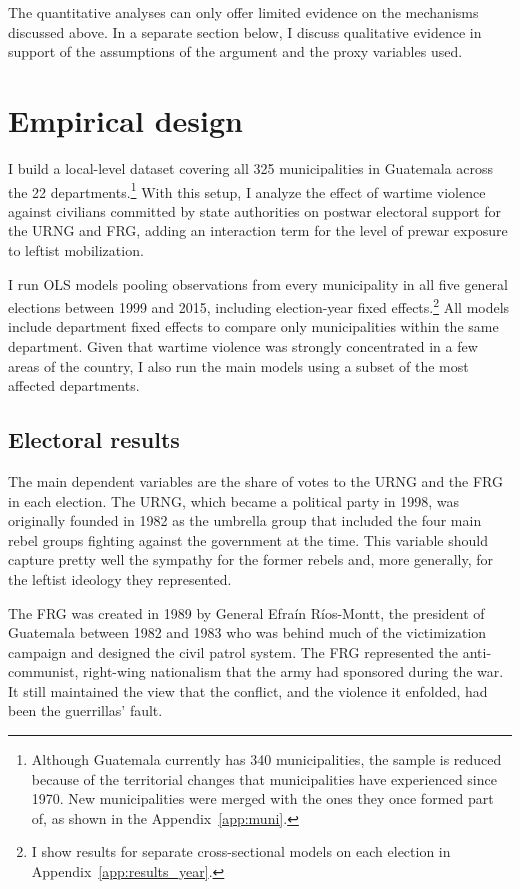 \documentclass[12pt, notitlepage]{article}
\begin{document}
The quantitative analyses can only offer limited evidence on the mechanisms discussed above.
In a separate section below, I discuss qualitative evidence in support of the assumptions of the argument and the proxy variables used.

\section*{Empirical design}

I build a local-level dataset covering all 325 municipalities in Guatemala across the 22 departments.\footnote{Although Guatemala currently has 340 municipalities, the sample is reduced because of the territorial changes that municipalities have experienced since 1970. New municipalities were merged with the ones they once formed part of, as shown in the Appendix~\ref{app:muni}.}
With this setup, I analyze the effect of wartime violence against civilians committed by state authorities on postwar electoral support for the URNG and FRG, adding an interaction term for the level of prewar exposure to leftist mobilization.

I run OLS models pooling observations from every municipality in all five general elections between 1999 and 2015, including election-year fixed effects.\footnote{I show results for separate cross-sectional models on each election in Appendix~\ref{app:results_year}.}
All models include department fixed effects to compare only municipalities within the same department.
Given that wartime violence was strongly concentrated in a few areas of the country, I also run the main models using a subset of the most affected departments.

\subsection*{Electoral results}

The main dependent variables are the share of votes to the URNG and the FRG in each election.
The URNG, which became a political party in 1998, was originally founded in 1982 as the umbrella group that included the four main rebel groups fighting against the government at the time.
This variable should capture pretty well the sympathy for the former rebels and, more generally, for the leftist ideology they represented.

The FRG was created in 1989 by General Efraín Ríos-Montt, the president of Guatemala between 1982 and 1983 who was behind much of the victimization campaign and designed the civil patrol system.
The FRG represented the anti-communist, right-wing nationalism that the army had sponsored during the war.
It still maintained the view that the conflict, and the violence it enfolded, had been the guerrillas' fault.
\end{document}
